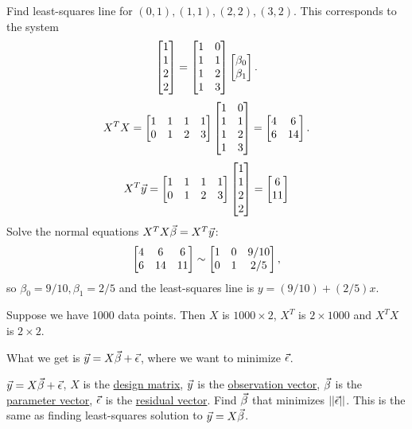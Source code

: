 \documentclass[10pt,a4paper]{article}
\begin{document}
\begin{example}
	Find least-squares  line for $(0,1),(1,1),(2,2),(3,2)$.
	This corresponds to the system
	$$\begin{bmatrix}1\\1\\2\\2\end{bmatrix}=\begin{bmatrix}1&0\\1&1\\1&2\\1&3\end{bmatrix}\begin{bmatrix}\beta_0\\\beta_1\end{bmatrix}.$$
	$$X^TX = \begin{bmatrix}1&1&1&1\\0&1&2&3\end{bmatrix}\begin{bmatrix}1&0\\1&1\\1&2\\1&3\end{bmatrix} = \begin{bmatrix}4&6\\6&14\end{bmatrix}.$$
	$$X^T\vec{y} = \begin{bmatrix}1&1&1&1\\0&1&2&3\end{bmatrix}\begin{bmatrix}1\\1\\2\\2\end{bmatrix} = \begin{bmatrix}6\\11\end{bmatrix}$$
	Solve the normal equations $X^TX\vec{\beta} = X^T\vec{y}$:
	$$\begin{bmatrix}4&6&6\\6&14&11\end{bmatrix}\sim\begin{bmatrix}1&0&9/10\\0&1&2/5\end{bmatrix},$$
	so $\beta_0 = 9/10,\beta_1=2/5$ and the least-squares line is $y = (9/10)+(2/5)x$.
\end{example}
\begin{example}
	Suppose we have 1000 data points. Then $X$ is $1000\times 2$, $X^T$ is $2\times 1000$ and $X^TX$ is $2\times 2$.
\end{example}
What we get is $\vec{y}=X\vec{\beta} + \vec{\epsilon}$, where we want to minimize $\vec{\epsilon}$.
\begin{definition}
	$\vec{y}=X\vec{\beta}+\vec{\epsilon}$, $X$ is the \underline{design matrix}, $\vec{y}$ is the \underline{observation vector}, $\vec{\beta}$ is the \underline{parameter vector}, $\vec{\epsilon}$ is the \underline{residual vector}. Find $\vec{\beta}$ that minimizes $||\vec{\epsilon}||$. This is the same as finding least-squares solution to $\vec{y}=X\vec{\beta}$.
\end{definition}
\end{document}

